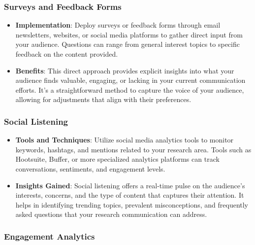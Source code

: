 \documentclass[
]{book}
\providecommand{\tightlist}{%
  \setlength{\itemsep}{0pt}\setlength{\parskip}{0pt}}
\begin{document}
\hypertarget{surveys-and-feedback-forms}{%
\subsubsection{Surveys and Feedback Forms}\label{surveys-and-feedback-forms}}

\begin{itemize}
\tightlist
\item
  \textbf{Implementation}: Deploy surveys or feedback forms through email newsletters, websites, or social media platforms to gather direct input from your audience. Questions can range from general interest topics to specific feedback on the content provided.
\item
  \textbf{Benefits}: This direct approach provides explicit insights into what your audience finds valuable, engaging, or lacking in your current communication efforts. It's a straightforward method to capture the voice of your audience, allowing for adjustments that align with their preferences.
\end{itemize}

\hypertarget{social-listening}{%
\subsubsection{Social Listening}\label{social-listening}}

\begin{itemize}
\tightlist
\item
  \textbf{Tools and Techniques}: Utilize social media analytics tools to monitor keywords, hashtags, and mentions related to your research area. Tools such as Hootsuite, Buffer, or more specialized analytics platforms can track conversations, sentiments, and engagement levels.
\item
  \textbf{Insights Gained}: Social listening offers a real-time pulse on the audience's interests, concerns, and the type of content that captures their attention. It helps in identifying trending topics, prevalent misconceptions, and frequently asked questions that your research communication can address.
\end{itemize}

\hypertarget{engagement-analytics}{%
\subsubsection{Engagement Analytics}\label{engagement-analytics}}
\end{document}
